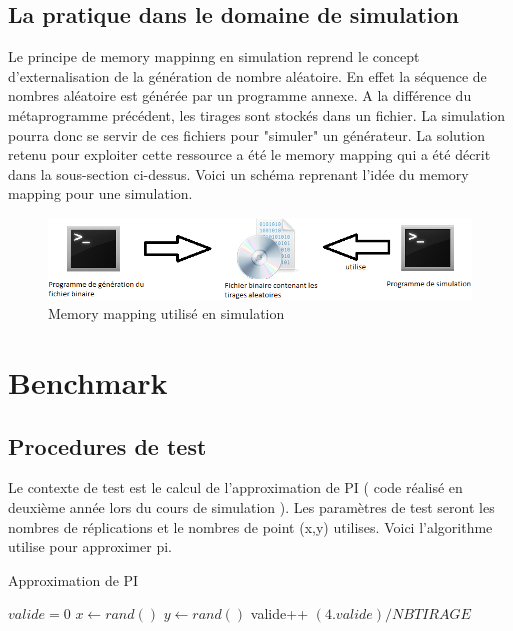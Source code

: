 \documentclass[a4paper,11pt]{report}
\begin{document}
\subsection{La pratique dans le domaine de simulation}

\normalsize{
Le principe de memory mappinng en simulation reprend le concept d'externalisation de la génération de nombre aléatoire. En effet la séquence de nombres aléatoire est générée par un programme annexe. A la différence du métaprogramme précédent, les tirages sont stockés dans un fichier. La simulation pourra donc se servir de ces fichiers pour "simuler" un générateur. La solution retenu pour exploiter cette ressource a été le memory mapping qui a été décrit dans la sous-section ci-dessus. Voici un schéma reprenant l'idée du memory mapping pour une simulation.
}

\begin{figure}[h]
   \begin{center}
   \includegraphics[scale = 0.65]{generationmmap.PNG}
   \end{center}
  \caption{Memory mapping utilisé en simulation}
\end{figure}



\section{Benchmark}

\subsection{Procedures de test}

\normalsize{
Le contexte de test est le calcul de l'approximation de PI ( code réalisé en deuxième année lors du cours de simulation ).  Les paramètres de test seront les nombres de réplications et le nombres de point (x,y) utilises. Voici l'algorithme utilise pour approximer pi. \\
}

\begin{algorithm}[h]
\caption{Approximation de PI}
\begin{algorithmic}
\STATE $valide = 0$
\STATE $ x \gets rand()$
\STATE $ y \gets rand()$
 \STATE valide++
\ENDIF
\ENDFOR
\RETURN $ (4 . valide) / NBTIRAGE $
\end{algorithmic}
\end{algorithm}
\end{document}
